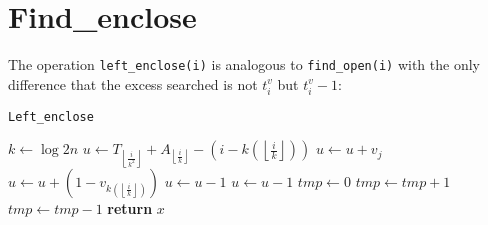 \documentclass{article}
\begin{document}
\section{Find\_enclose}
The operation \texttt{left\_enclose(i)} is analogous to \texttt{find\_open(i)} with the only difference that the excess searched is not $t^v_i$ but $t^v_i-1$:
    \begin{algorithm}[H]
    \caption{\texttt{Left\_enclose}}\label{leftenclose}
    \begin{algorithmic}[1]
        \State $k\gets\log{2n}$
        \State $u\gets T_{\left\lfloor{\frac{i}{k^2}}\right\rfloor}+A_{\left\lfloor{\frac{i}{k}}\right\rfloor}-(i-k(\left\lfloor{\frac{i}{k}}\right\rfloor))$
            \State $u\gets u+v_j$
        \EndFor
        \State $u\gets u+(1-v_{k(\left\lfloor{\frac{i}{k}}\right\rfloor)})$
            \State $u\gets u-1$
        \EndIf
        \State $u\gets u-1$
        \State $tmp\gets 0$
                \State $tmp\gets tmp+1$
            \Else  
                \State $tmp\gets tmp-1$
            \EndIf
                \State \textbf{return} $x$
    \end{algorithmic}
    \end{algorithm}
\end{document}
